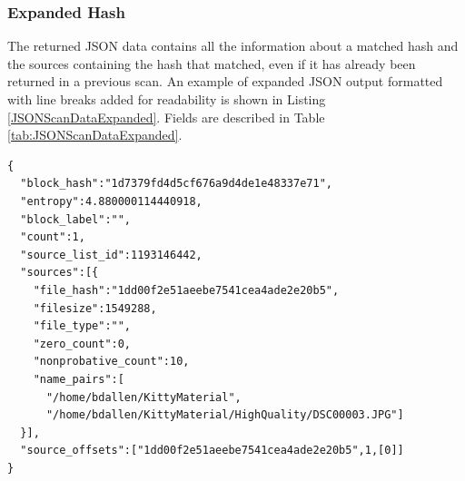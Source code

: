 \documentclass[11pt,fleqn]{article} %
\begin{document}
\subsubsection{Expanded Hash}
The returned JSON data contains all the information about a matched hash and the sources containing the hash that matched, even if it has already been returned in a previous scan. An example of expanded JSON output formatted with line breaks added for readability is shown in Listing \ref{JSONScanDataExpanded}. Fields are described in Table \ref{tab:JSONScanDataExpanded}.\\

\lstset{style=customfile}
\begin{lstlisting}[float, caption={Example JSON block hash expanded data output from a scan match, with line breaks added for readability}, label=JSONScanDataExpanded]
{
  "block_hash":"1d7379fd4d5cf676a9d4de1e48337e71",
  "entropy":4.880000114440918,
  "block_label":"",
  "count":1,
  "source_list_id":1193146442,
  "sources":[{
    "file_hash":"1dd00f2e51aeebe7541cea4ade2e20b5",
    "filesize":1549288,
    "file_type":"",
    "zero_count":0,
    "nonprobative_count":10,
    "name_pairs":[
      "/home/bdallen/KittyMaterial",
      "/home/bdallen/KittyMaterial/HighQuality/DSC00003.JPG"]
  }],
  "source_offsets":["1dd00f2e51aeebe7541cea4ade2e20b5",1,[0]]
}
\end{lstlisting}
\end{document}
